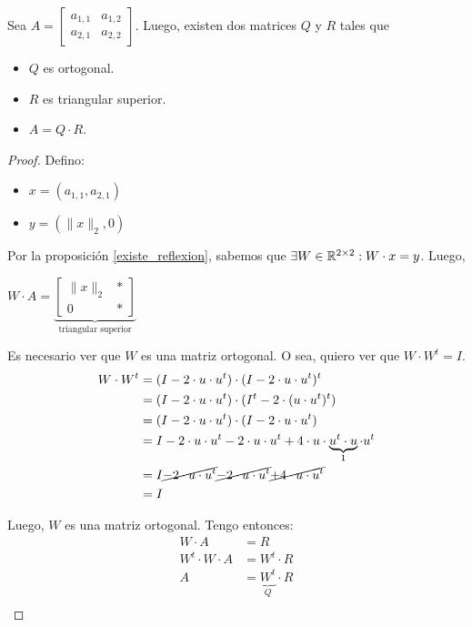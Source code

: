 \documentclass[]{article}
\begin{document}
\begin{prop}
	Sea $A = \begin{bmatrix}
		a_{1,1}&a_{1,2}\\
		a_{2,1}&a_{2,2}
	\end{bmatrix}$. Luego, existen dos matrices $Q$ y $R$ tales que

	\begin{itemize}
		\item $Q$ es ortogonal.
		\item $R$ es triangular superior.
		\item $A = Q\cdot R$.
	\end{itemize}
	\begin{proof}
		 Defino:
		 \begin{itemize}
		 	\item $x = (a_{1,1},a_{2,1})$
			\item $y = (\|x\|_2,0)$
		 \end{itemize}

		Por la proposición \ref{existe_reflexion}, sabemos que $\exists W\in\mathbb{R}^{2 \times 2} : W\cdot x = y$. Luego,
		\begin{center}
			$W\cdot A = \underbrace{\begin{bmatrix}
				\|x\|_2 & * \\ 0 & *
			\end{bmatrix}}_\text{triangular superior}$
		\end{center}

		Es necesario ver que $W$ es una matriz ortogonal. O sea, quiero ver que $W\cdot W^t = I$.
		\begin{align*}
			W\cdot W^t &= (I-2\cdot u\cdot u^t)\cdot(I-2\cdot u\cdot u^t)^t\\
			&= (I-2\cdot u\cdot u^t)\cdot(I^t-2\cdot (u\cdot u^t)^t)\\
			&= (I-2\cdot u\cdot u^t)\cdot(I-2\cdot u\cdot u^t)\\
			&= I-2\cdot u\cdot u^t - 2\cdot u\cdot u^t + 4\cdot u\cdot \underbrace{u^t\cdot u}_{1}\cdot u^t\\
			&= I\cancel{-2\cdot u\cdot u^t} \cancel{- 2\cdot u\cdot u^t} \cancel{+ 4\cdot u\cdot u^t}\\
			&= I
		\end{align*}

		Luego, $W$ es una matriz ortogonal. Tengo entonces:
		\begin{align*}
			W\cdot A &= R\\
			W^t \cdot W \cdot A &= W^t \cdot R\\
			A &= \underbrace{W^t}_Q \cdot R\\
		\end{align*}
	\end{proof}
\end{prop}
\end{document}
